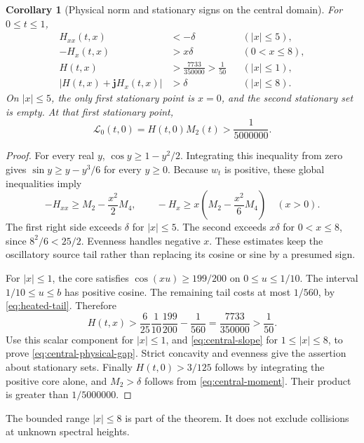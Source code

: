 \documentclass[11pt]{article}
\numberwithin{equation}{section}
\newtheorem{corollary}[theorem]{Corollary}
\theoremstyle{definition}
\theoremstyle{remark}
\begin{document}
\begin{corollary}[Physical norm and stationary signs on the central domain]
\label{cor:central-gap}
For \(0\leq t\leq1\),
\begin{align}
 H_{xx}(t,x)&<-\delta &&(|x|\leq5), \label{eq:central-curvature}\\
 -H_x(t,x)&>x\delta &&(0<x\leq8), \label{eq:central-slope}\\
 H(t,x)&>\frac{7733}{350000}>\frac1{50} &&(|x|\leq1), \label{eq:central-value}\\
 |H(t,x)+\mathbf jH_x(t,x)|&>\delta &&(|x|\leq8).
 \label{eq:central-physical-gap}
\end{align}
On \(|x|\leq5\), the only first stationary point is \(x=0\), and the
second stationary set is empty.  At that first stationary point,
\begin{equation}
 \mathscr L_0(t,0)=H(t,0)M_2(t)>\frac1{5000000}.
 \label{eq:central-stationary}
\end{equation}
\end{corollary}

\begin{proof}
For every real \(y\), \(\cos y\geq1-y^2/2\).
Integrating this inequality from zero gives
\(\sin y\geq y-y^3/6\) for every \(y\geq0\).
Because \(w_t\) is positive, these global inequalities imply
\[
 -H_{xx}\geq M_2-\frac{x^2}{2}M_4,\qquad
 -H_x\geq x\left(M_2-\frac{x^2}{6}M_4\right)\quad(x>0).
\]
The first right side exceeds \(\delta\) for \(|x|\leq5\).
The second exceeds \(x\delta\) for \(0<x\leq8\), since
\(8^2/6<25/2\).  Evenness handles negative \(x\).
These estimates keep the oscillatory source tail rather than replacing
its cosine or sine by a presumed sign.

For \(|x|\leq1\), the core satisfies
\(\cos(xu)\geq199/200\) on \(0\leq u\leq1/10\).
The interval \(1/10\leq u\leq b\) has positive cosine.
The remaining tail costs at most \(1/560\), by
\eqref{eq:heated-tail}.  Therefore
\[
 H(t,x)>\frac6{25}\frac1{10}\frac{199}{200}-\frac1{560}
 =\frac{7733}{350000}>\frac1{50}.
\]
Use this scalar component for \(|x|\leq1\), and
\eqref{eq:central-slope} for \(1\leq|x|\leq8\), to prove
\eqref{eq:central-physical-gap}.
Strict concavity and evenness give the assertion about stationary sets.
Finally \(H(t,0)>3/125\) follows by integrating the positive core alone,
and \(M_2>\delta\) follows from \eqref{eq:central-moment}.
Their product is greater than \(1/5000000\).
\end{proof}

The bounded range \(|x|\leq8\) is part of the theorem.
It does not exclude collisions at unknown spectral heights.
\end{document}
